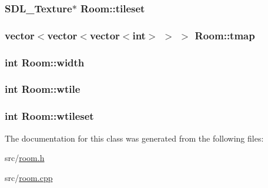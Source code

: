 \hypertarget{class_room_a5cd50f4bfda869d4ad45cb52c7e97f5b}{
\subsubsection[{tileset}]{\setlength{\rightskip}{0pt plus 5cm}S\-D\-L\-\_\-\-Texture$\ast$ Room\-::tileset\hspace{0.3cm}{\ttfamily [protected]}}}\label{class_room_a5cd50f4bfda869d4ad45cb52c7e97f5b}
\hypertarget{class_room_aba520dbf1dd1907f5cdcbc8b6372ec53}{
\subsubsection[{tmap}]{\setlength{\rightskip}{0pt plus 5cm}vector$<$vector$<$vector$<$int$>$ $>$ $>$ Room\-::tmap\hspace{0.3cm}{\ttfamily [protected]}}}\label{class_room_aba520dbf1dd1907f5cdcbc8b6372ec53}
\hypertarget{class_room_a0c68c6762e7d93eb459ba552dadaf308}{
\subsubsection[{width}]{\setlength{\rightskip}{0pt plus 5cm}int Room\-::width\hspace{0.3cm}{\ttfamily [protected]}}}\label{class_room_a0c68c6762e7d93eb459ba552dadaf308}
\hypertarget{class_room_ac2d78d3f1097249ae3a447ebe907ed9c}{
\subsubsection[{wtile}]{\setlength{\rightskip}{0pt plus 5cm}int Room\-::wtile\hspace{0.3cm}{\ttfamily [protected]}}}\label{class_room_ac2d78d3f1097249ae3a447ebe907ed9c}
\hypertarget{class_room_aa5480a57c054045be3c677e43e358357}{
\subsubsection[{wtileset}]{\setlength{\rightskip}{0pt plus 5cm}int Room\-::wtileset\hspace{0.3cm}{\ttfamily [protected]}}}\label{class_room_aa5480a57c054045be3c677e43e358357}


The documentation for this class was generated from the following files\-:\begin{DoxyCompactItemize}
\item 
src/\hyperlink{room_8h}{room.\-h}\item 
src/\hyperlink{room_8cpp}{room.\-cpp}\end{DoxyCompactItemize}
